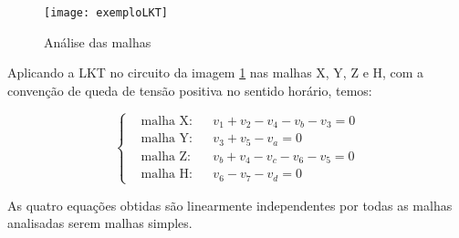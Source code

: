 \documentclass[12pt,fleqn]{book} %
\begin{document}
    
    \begin{example}[LKT]
        \begin{figure}[!htbp] \centering\texttt{[image: exemploLKT]}
            \caption{Análise das malhas}\label{LKTimg} 
        \end{figure} 
        
Aplicando a LKT no circuito da imagem \ref{LKTimg} nas malhas X, Y, Z e H, com a convenção de queda de tensão positiva no sentido horário, temos:    
    
\begin{equation}\label{sistemaMalha}
    \left\{\begin{aligned} & 
         \text{malha X:} && v_1+v_2-v_4-v_b-v_3=0\\& 
         \text{malha Y:} && v_3+v_5-v_a=0\\&
        \text{malha Z:} && v_b+v_4-v_c-v_6-v_5=0\\&
        \text{malha H:} && v_6-v_7-v_d=0
    \end{aligned}\right.
    \end{equation}    
    
 As quatro equações obtidas são linearmente independentes por todas as malhas analisadas serem malhas simples.    
    
    \end{example}
    
\end{document}
